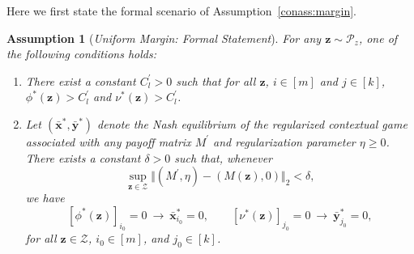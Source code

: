 \documentclass[12pt]{article}
\newtheorem{assumption}{Assumption}[section]
\begin{document}
Here we first state the formal scenario of Assumption~\ref{conass:margin}.
\begin{assumption}[{\emph{Uniform Margin: Formal Statement}}]
\label{conass:margin_formal}
For any $\bm{z} \sim \mathcal{P}_z$, one of the following conditions holds:
\begin{enumerate}
\item[\textnormal{(i)}]
There exist a constant $C_l^\prime>0$ such that for all $\bm{z}$, $i \in [m]$ and $j \in [k]$, $\phi^\ast(\bm{z}) > C_l^\prime$ and $\nu^\ast(\bm{z})>C_l^\prime$.
\item[\textnormal{(ii)}]
Let $(\bar{\bm x}^\ast,\bar{\bm y}^\ast)$ denote the Nash equilibrium of the regularized contextual game associated with any payoff matrix $M^\prime$ and regularization parameter $\eta\ge 0$. There exists a constant $\delta>0$ such that, whenever
\[
\sup_{\bm z\in\mathcal Z}
\Vert
\left(M^\prime,\eta\right) -
\left(M(\bm z),0\right)
\Vert_2
< \delta,
\]
we have
\[
[\phi^\ast(\bm z)]_{i_0}=0
\ \to\
\bar{\bm x}^\ast_{i_0}=0,
\qquad
[\nu^\ast(\bm z)]_{j_0}=0
\ \to\
\bar{\bm y}^\ast_{j_0}=0,
\]
for all $\bm z\in\mathcal Z$, $i_0\in[m]$, and $j_0\in[k]$.
\end{enumerate}
\end{assumption}
\end{document}
